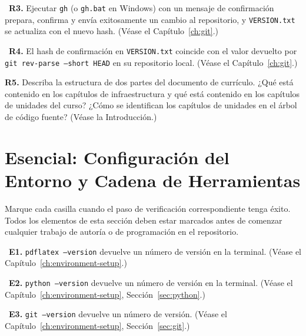 \begin{Form}
\vs

\noindent\CheckBox[name=r3,width=0.4cm,height=0.4cm]{}~\textbf{R3.}
Ejecutar \texttt{gh} (o \texttt{gh.bat} en Windows) con un mensaje
de confirmación prepara, confirma y envía exitosamente un cambio al
repositorio, y \texttt{VERSION.txt} se actualiza con el nuevo hash.
(Véase el Capítulo~\ref{ch:git}.)

\vs

\noindent\CheckBox[name=r4,width=0.4cm,height=0.4cm]{}~\textbf{R4.}
El hash de confirmación en \texttt{VERSION.txt} coincide con el
valor devuelto por \texttt{git rev-parse --short HEAD} en su
repositorio local.
(Véase el Capítulo~\ref{ch:git}.)

\vs

\noindent\textbf{R5.} Describa la estructura de dos partes del
documento de currículo. ¿Qué está contenido en los capítulos de
infraestructura y qué está contenido en los capítulos de unidades
del curso? ¿Cómo se identifican los capítulos de unidades en el
árbol de código fuente?
(Véase la Introducción.)\\[4pt]
\TextField[name=r5,width=\linewidth,height=3cm,multiline=true,
           bordercolor=black]{}

\section{Esencial: Configuración del Entorno y Cadena de Herramientas}
\label{sec:assess-essential}

Marque cada casilla cuando el paso de verificación correspondiente
tenga éxito. Todos los elementos de esta sección deben estar marcados
antes de comenzar cualquier trabajo de autoría o de programación en
el repositorio.

\vs

\noindent\CheckBox[name=e1,width=0.4cm,height=0.4cm]{}~\textbf{E1.}
\texttt{pdflatex --version} devuelve un número de versión en la
terminal.
(Véase el Capítulo~\ref{ch:environment-setup}.)

\vs

\noindent\CheckBox[name=e2,width=0.4cm,height=0.4cm]{}~\textbf{E2.}
\texttt{python --version} devuelve un número de versión en la terminal.
(Véase el Capítulo~\ref{ch:environment-setup}, Sección~\ref{sec:python}.)

\vs

\noindent\CheckBox[name=e3,width=0.4cm,height=0.4cm]{}~\textbf{E3.}
\texttt{git --version} devuelve un número de versión.
(Véase el Capítulo~\ref{ch:environment-setup}, Sección~\ref{sec:git}.)


\end{Form}
